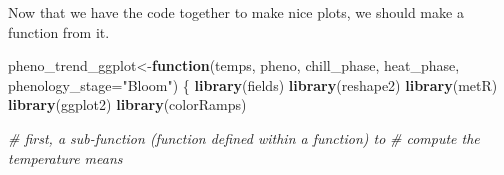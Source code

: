 \documentclass[
]{book}
\newenvironment{Shaded}{\begin{snugshade}}{\end{snugshade}}
\newcommand{\CommentTok}[1]{\textcolor[rgb]{0.56,0.35,0.01}{\textit{#1}}}
\newcommand{\ControlFlowTok}[1]{\textcolor[rgb]{0.13,0.29,0.53}{\textbf{#1}}}
\newcommand{\DataTypeTok}[1]{\textcolor[rgb]{0.13,0.29,0.53}{#1}}
\newcommand{\KeywordTok}[1]{\textcolor[rgb]{0.13,0.29,0.53}{\textbf{#1}}}
\newcommand{\NormalTok}[1]{#1}
\newcommand{\StringTok}[1]{\textcolor[rgb]{0.31,0.60,0.02}{#1}}
\begin{document}
Now that we have the code together to make nice plots, we should make a function from it.

\begin{Shaded}
\begin{Highlighting}[]
\NormalTok{pheno_trend_ggplot<-}\ControlFlowTok{function}\NormalTok{(temps,}
\NormalTok{                             pheno,}
\NormalTok{                             chill_phase,}
\NormalTok{                             heat_phase,}
                             \DataTypeTok{phenology_stage=}\StringTok{"Bloom"}\NormalTok{)}
\NormalTok{\{}
  \KeywordTok{library}\NormalTok{(fields)}
  \KeywordTok{library}\NormalTok{(reshape2)}
  \KeywordTok{library}\NormalTok{(metR)}
  \KeywordTok{library}\NormalTok{(ggplot2)}
  \KeywordTok{library}\NormalTok{(colorRamps)}
  
  \CommentTok{# first, a sub-function (function defined within a function) to}
  \CommentTok{# compute the temperature means}
  

\end{Highlighting}
\end{Shaded}
\end{document}
